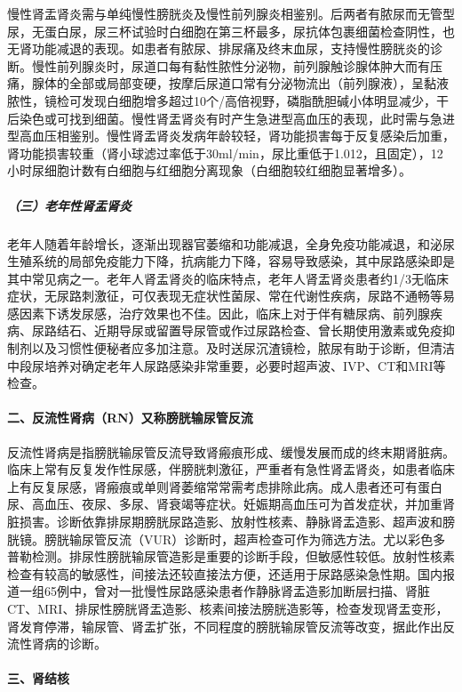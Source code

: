 慢性肾盂肾炎需与单纯慢性膀胱炎及慢性前列腺炎相鉴别。后两者有脓尿而无管型尿，无蛋白尿，尿三杯试验时白细胞在第三杯最多，尿抗体包裹细菌检查阴性，也无肾功能减退的表现。如患者有脓尿、排尿痛及终末血尿，支持慢性膀胱炎的诊断。慢性前列腺炎时，尿道口每有黏性脓性分泌物，前列腺触诊腺体肿大而有压痛，腺体的全部或局部变硬，按摩后尿道口常有分泌物流出（前列腺液），呈黏液脓性，镜检可发现白细胞增多超过10个/高倍视野，磷脂酰胆碱小体明显减少，干后染色或可找到细菌。慢性肾盂肾炎有时产生急进型高血压的表现，此时需与急进型高血压相鉴别。慢性肾盂肾炎发病年龄较轻，肾功能损害每于反复感染后加重，肾功能损害较重（肾小球滤过率低于30ml/min，尿比重低于1.012，且固定），12小时尿细胞计数有白细胞与红细胞分离现象（白细胞较红细胞显著增多）。

\subparagraph{（三）老年性肾盂肾炎}

老年人随着年龄增长，逐渐出现器官萎缩和功能减退，全身免疫功能减退，和泌尿生殖系统的局部免疫能力下降，抗病能力下降，容易导致感染，其中尿路感染即是其中常见病之一。老年人肾盂肾炎的临床特点，老年人肾盂肾炎患者约1/3无临床症状，无尿路刺激征，可仅表现无症状性菌尿、常在代谢性疾病，尿路不通畅等易感因素下诱发尿感，治疗效果也不佳。因此，临床上对于伴有糖尿病、前列腺疾病、尿路结石、近期导尿或留置导尿管或作过尿路检查、曾长期使用激素或免疫抑制剂以及习惯性便秘者应多加注意。及时送尿沉渣镜检，脓尿有助于诊断，但清洁中段尿培养对确定老年人尿路感染非常重要，必要时超声波、IVP、CT和MRI等检查。

\paragraph{二、反流性肾病（RN）又称膀胱输尿管反流}

反流性肾病是指膀胱输尿管反流导致肾瘢痕形成、缓慢发展而成的终末期肾脏病。临床上常有反复发作性尿感，伴膀胱刺激征，严重者有急性肾盂肾炎，如患者临床上有反复尿感，肾瘢痕或单则肾萎缩常常需考虑排除此病。成人患者还可有蛋白尿、高血压、夜尿、多尿、肾衰竭等症状。妊娠期高血压可为首发症状，并加重肾脏损害。诊断依靠排尿期膀胱尿路造影、放射性核素、静脉肾盂造影、超声波和膀胱镜。膀胱输尿管反流（VUR）诊断时，超声检查可作为筛选方法。尤以彩色多普勒检测。排尿性膀胱输尿管造影是重要的诊断手段，但敏感性较低。放射性核素检查有较高的敏感性，间接法还较直接法方便，还适用于尿路感染急性期。国内报道一组65例中，曾对一批慢性尿路感染患者作静脉肾盂造影加断层扫描、肾脏CT、MRI、排尿性膀胱肾盂造影、核素间接法膀胱造影等，检查发现肾盂变形，肾发育停滞，输尿管、肾盂扩张，不同程度的膀胱输尿管反流等改变，据此作出反流性肾病的诊断。

\paragraph{三、肾结核}

